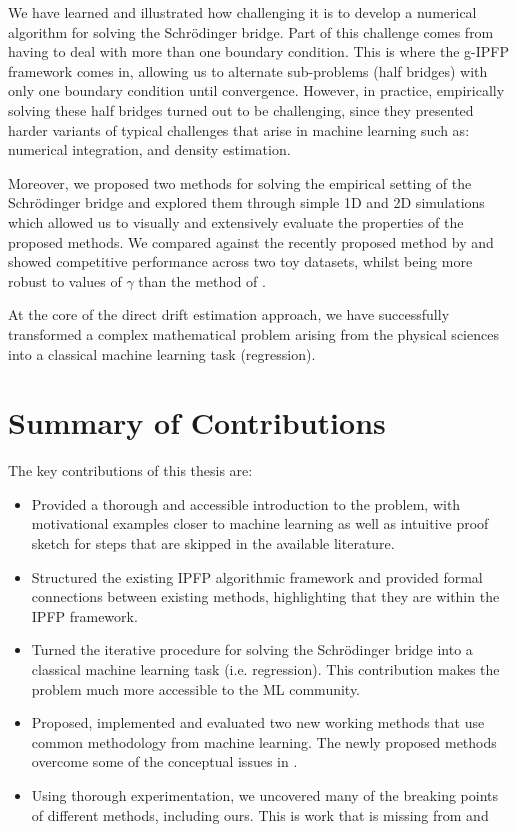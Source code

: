 \documentclass[a4paper,12pt,twoside,openright]{report}
\theoremstyle{definition}
\begin{document}
We have learned and illustrated how challenging it is to develop a numerical algorithm for solving the Schrödinger bridge. Part of this challenge comes from having to deal with more than one boundary condition. This is where the g-IPFP framework comes in, allowing us to alternate sub-problems (half bridges) with only one boundary condition until convergence. However, in practice, empirically solving these half bridges turned out to be challenging, since they presented harder variants of typical challenges that arise in machine learning such as: numerical integration, and density estimation.

Moreover, we proposed two methods for solving the empirical setting of the Schrödinger bridge and explored them through simple 1D and 2D simulations which allowed us to visually and extensively evaluate the properties of the proposed methods.  We compared against the recently proposed method by \cite{pavon2018data} and showed competitive performance across two toy datasets, whilst being more robust to values of $\gamma$ than the method of \citep{pavon2018data}.

At the core of the direct drift estimation approach, we have successfully transformed a complex mathematical problem arising from the physical sciences into a classical machine learning task (regression).

\section{Summary of Contributions}

The key contributions of this thesis are:

\begin{itemize}
    \item Provided a thorough and accessible introduction to the problem, with motivational examples closer to machine learning as well as intuitive proof sketch for steps that are skipped in the available literature.
    \item Structured the existing IPFP algorithmic framework and provided formal connections between existing methods, highlighting that they are within the IPFP framework.
    \item Turned the iterative procedure for solving the Schrödinger bridge into a classical machine learning task (i.e. regression). This contribution makes the problem much more accessible to the ML community.
    \item Proposed, implemented and evaluated two new working methods that use common methodology from machine learning. The newly proposed methods overcome some of the conceptual issues in \cite{pavon2018data}.
    \item Using thorough experimentation, we uncovered many of the breaking points of different methods, including ours. This is work that is missing from \cite{pavon2018data} and \cite{bernton2019schr}
\end{itemize}
\end{document}
